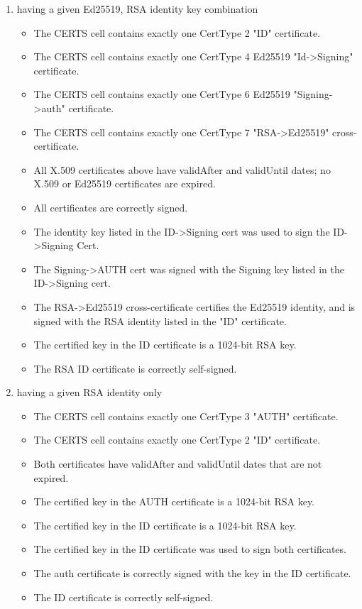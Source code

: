 \begin{enumerate}
    \item having a given Ed25519, RSA identity key combination
        \begin{itemize}
            \item The CERTS cell contains exactly one CertType 2 "ID" certificate.
            \item The CERTS cell contains exactly one CertType 4 Ed25519
            "Id->Signing" certificate.
            \item The CERTS cell contains exactly one CertType 6 Ed25519
            "Signing->auth" certificate.
            \item The CERTS cell contains exactly one CertType 7 "RSA->Ed25519"
            cross-certificate.
            \item All X.509 certificates above have validAfter and validUntil dates;
            no X.509 or Ed25519 certificates are expired.
            \item All certificates are correctly signed.
            \item The identity key listed in the ID->Signing cert was used to
            sign the ID->Signing Cert.
            \item The Signing->AUTH cert was signed with the Signing key listed
            in the ID->Signing cert.
            \item The RSA->Ed25519 cross-certificate certifies the Ed25519
            identity, and is signed with the RSA identity listed in the
            "ID" certificate.
            \item The certified key in the ID certificate is a 1024-bit RSA key.
            \item The RSA ID certificate is correctly self-signed.
        \end{itemize}
    \item having a given RSA identity only
        \begin{itemize}
            \item The CERTS cell contains exactly one CertType 3 "AUTH" certificate.
            \item The CERTS cell contains exactly one CertType 2 "ID" certificate.
            \item Both certificates have validAfter and validUntil dates that
            are not expired.
            \item The certified key in the AUTH certificate is a 1024-bit RSA key.
            \item The certified key in the ID certificate is a 1024-bit RSA key.
            \item The certified key in the ID certificate was used to sign both
            certificates.
            \item The auth certificate is correctly signed with the key in the
            ID certificate.
            \item The ID certificate is correctly self-signed.
        \end{itemize}
\end{enumerate}


